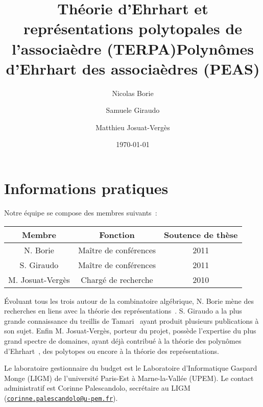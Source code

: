 \documentclass[a4paper, 10pt]{article}
\title{Théorie d'Ehrhart et représentations polytopales de
l'associaèdre (TERPA)} %
\title{{\bf P}olynômes d'{\bf E}hrhart des {\bf a}ssociaèdre{\bf s}
(PEAS)}
\date{\today}
\author{Nicolas Borie \and Samuele Giraudo \and Matthieu Josuat-Verg\`es}
\numberwithin{equation}{subsection}
\begin{document}
\maketitle
\vspace{-1.5cm}

\section*{\center Informations pratiques}
Notre équipe se compose des membres suivants~:
\begin{center} \small
\begin{tabular}{|c|c|c|} \hline
    {\bf Membre} & {\bf Fonction} & {\bf Soutence de thèse}
        \\ \hline \hline
    N. Borie & Maître de conférences & 2011 \\ \hline
    S. Giraudo & Maître de conférences & 2011 \\ \hline
    M. Josuat-Vergès & Chargé de recherche & 2010 \\ \hline
\end{tabular}
\end{center}
\smallbreak

Évoluant tous les trois autour de la combinatoire algébrique, N. Borie
mène des recherches en liens avec la théorie des
représentations~\cite{Bor15}. S. Giraudo a la plus grande connaissance
du treillis de Tamari~\cite{Gir12} ayant produit plusieurs publications
à son sujet. Enfin M. Josuat-Vergès, porteur du projet, possède
l'expertise du plus grand spectre de domaines, ayant déjà contribué à la
théorie des polynômes d'Ehrhart~\cite{HJV16}, des polytopes ou encore à
la théorie des représentations.
\smallbreak

Le laboratoire gestionnaire du budget est le Laboratoire d'Informatique
Gaspard Monge (LIGM) de l'université Paris-Est à Marne-la-Vallée (UPEM).
Le contact administratif est Corinne Palescandolo, secrétaire au LIGM
(\href{mailto:corinne.palescandolo@u-pem.fr}
{\tt corinne.palescandolo@u-pem.fr}).
\smallbreak

\vspace{-1cm}

\end{document}
